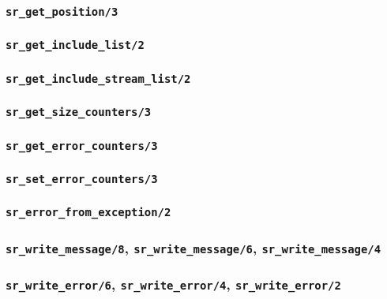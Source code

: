 \subsubsection{\texttt{sr\_get\_position/3}}

\subsubsection{\texttt{sr\_get\_include\_list/2}}

\subsubsection{\texttt{sr\_get\_include\_stream\_list/2}}

\subsubsection{\texttt{sr\_get\_size\_counters/3}}

\subsubsection{\texttt{sr\_get\_error\_counters/3}}

\subsubsection{\texttt{sr\_set\_error\_counters/3}}

\subsubsection{\texttt{sr\_error\_from\_exception/2}}

\subsubsection{\texttt{sr\_write\_message/8},
               \texttt{sr\_write\_message/6},
               \texttt{sr\_write\_message/4}}

\subsubsection{\texttt{sr\_write\_error/6},
               \texttt{sr\_write\_error/4},
               \texttt{sr\_write\_error/2}}



